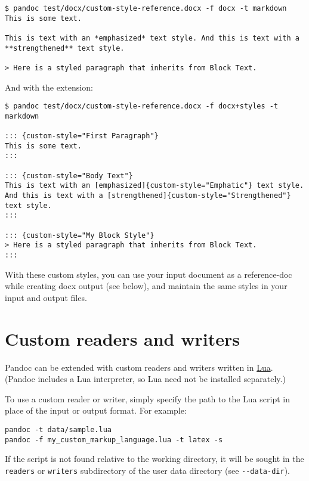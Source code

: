 \documentclass[
]{article}
\begin{document}
\begin{verbatim}
$ pandoc test/docx/custom-style-reference.docx -f docx -t markdown
This is some text.

This is text with an *emphasized* text style. And this is text with a
**strengthened** text style.

> Here is a styled paragraph that inherits from Block Text.
\end{verbatim}

And with the extension:

\begin{verbatim}
$ pandoc test/docx/custom-style-reference.docx -f docx+styles -t markdown

::: {custom-style="First Paragraph"}
This is some text.
:::

::: {custom-style="Body Text"}
This is text with an [emphasized]{custom-style="Emphatic"} text style.
And this is text with a [strengthened]{custom-style="Strengthened"}
text style.
:::

::: {custom-style="My Block Style"}
> Here is a styled paragraph that inherits from Block Text.
:::
\end{verbatim}

With these custom styles, you can use your input document as a
reference-doc while creating docx output (see below), and maintain the
same styles in your input and output files.

\hypertarget{custom-readers-and-writers}{%
\section{Custom readers and writers}\label{custom-readers-and-writers}}

Pandoc can be extended with custom readers and writers written in
\href{https://www.lua.org}{Lua}. (Pandoc includes a Lua interpreter, so
Lua need not be installed separately.)

To use a custom reader or writer, simply specify the path to the Lua
script in place of the input or output format. For example:

\begin{verbatim}
pandoc -t data/sample.lua
pandoc -f my_custom_markup_language.lua -t latex -s
\end{verbatim}

If the script is not found relative to the working directory, it will be
sought in the \texttt{readers} or \texttt{writers} subdirectory of the
user data directory (see \texttt{-\/-data-dir}).
\end{document}
